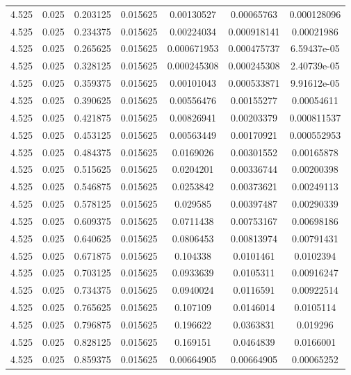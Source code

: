 \begin{table}[bh]
\begin{center}
{\begin{tabular}{ccccccc}
4.525	 & 0.025 & 	0.203125	 & 0.015625	 & 0.00130527	 & 0.00065763	 & 0.000128096 \\ 
4.525	 & 0.025 & 	0.234375	 & 0.015625	 & 0.00224034	 & 0.000918141	 & 0.00021986 \\ 
4.525	 & 0.025 & 	0.265625	 & 0.015625	 & 0.000671953	 & 0.000475737	 & 6.59437e-05 \\ 
4.525	 & 0.025 & 	0.328125	 & 0.015625	 & 0.000245308	 & 0.000245308	 & 2.40739e-05 \\ 
4.525	 & 0.025 & 	0.359375	 & 0.015625	 & 0.00101043	 & 0.000533871	 & 9.91612e-05 \\ 
4.525	 & 0.025 & 	0.390625	 & 0.015625	 & 0.00556476	 & 0.00155277	 & 0.00054611 \\ 
4.525	 & 0.025 & 	0.421875	 & 0.015625	 & 0.00826941	 & 0.00203379	 & 0.000811537 \\ 
4.525	 & 0.025 & 	0.453125	 & 0.015625	 & 0.00563449	 & 0.00170921	 & 0.000552953 \\ 
4.525	 & 0.025 & 	0.484375	 & 0.015625	 & 0.0169026	 & 0.00301552	 & 0.00165878 \\ 
4.525	 & 0.025 & 	0.515625	 & 0.015625	 & 0.0204201	 & 0.00336744	 & 0.00200398 \\ 
4.525	 & 0.025 & 	0.546875	 & 0.015625	 & 0.0253842	 & 0.00373621	 & 0.00249113 \\ 
4.525	 & 0.025 & 	0.578125	 & 0.015625	 & 0.029585	 & 0.00397487	 & 0.00290339 \\ 
4.525	 & 0.025 & 	0.609375	 & 0.015625	 & 0.0711438	 & 0.00753167	 & 0.00698186 \\ 
4.525	 & 0.025 & 	0.640625	 & 0.015625	 & 0.0806453	 & 0.00813974	 & 0.00791431 \\ 
4.525	 & 0.025 & 	0.671875	 & 0.015625	 & 0.104338	 & 0.0101461	 & 0.0102394 \\ 
4.525	 & 0.025 & 	0.703125	 & 0.015625	 & 0.0933639	 & 0.0105311	 & 0.00916247 \\ 
4.525	 & 0.025 & 	0.734375	 & 0.015625	 & 0.0940024	 & 0.0116591	 & 0.00922514 \\ 
4.525	 & 0.025 & 	0.765625	 & 0.015625	 & 0.107109	 & 0.0146014	 & 0.0105114 \\ 
4.525	 & 0.025 & 	0.796875	 & 0.015625	 & 0.196622	 & 0.0363831	 & 0.019296 \\ 
4.525	 & 0.025 & 	0.828125	 & 0.015625	 & 0.169151	 & 0.0464839	 & 0.0166001 \\ 
4.525	 & 0.025 & 	0.859375	 & 0.015625	 & 0.00664905	 & 0.00664905	 & 0.00065252 \\ 

\end{tabular}}
\end{center}
\end{table}
